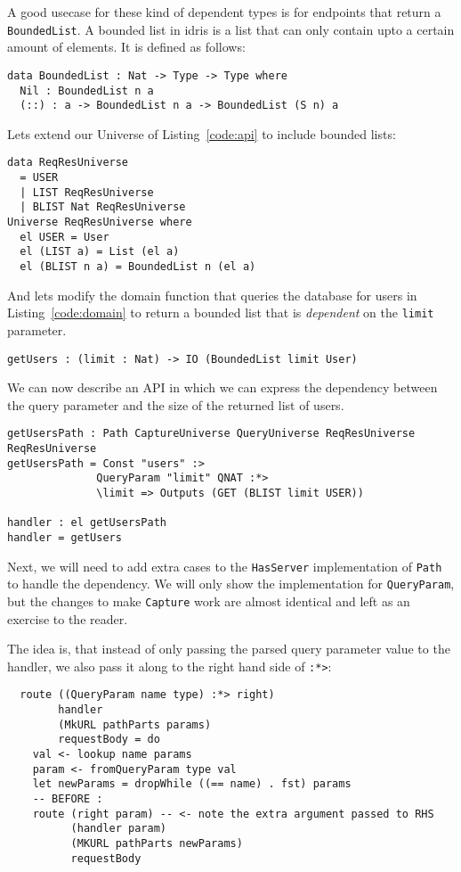 \documentclass[12pt,a4paper]{article}
\begin{document}
A good usecase for these kind of dependent types is for endpoints that return a \texttt{BoundedList}.
A bounded list in idris is a list that can only contain upto a certain amount of elements. It is defined as follows:
\begin{verbatim}
data BoundedList : Nat -> Type -> Type where
  Nil : BoundedList n a
  (::) : a -> BoundedList n a -> BoundedList (S n) a
\end{verbatim}

Lets extend our Universe of Listing~\ref{code:api} to include bounded lists:
\begin{verbatim}
data ReqResUniverse
  = USER
  | LIST ReqResUniverse
  | BLIST Nat ReqResUniverse
Universe ReqResUniverse where
  el USER = User
  el (LIST a) = List (el a)
  el (BLIST n a) = BoundedList n (el a)
\end{verbatim}
And lets modify the domain function that queries the database for users
in Listing~\ref{code:domain} to return a bounded list that is \emph{dependent} on the \texttt{limit} parameter.

\begin{verbatim}
getUsers : (limit : Nat) -> IO (BoundedList limit User)
\end{verbatim}
We can now describe an API in which we can express the dependency between the query parameter
and the size of the returned list of users.
\begin{verbatim}
getUsersPath : Path CaptureUniverse QueryUniverse ReqResUniverse ReqResUniverse
getUsersPath = Const "users" :> 
              QueryParam "limit" QNAT :*>
              \limit => Outputs (GET (BLIST limit USER))

handler : el getUsersPath
handler = getUsers
\end{verbatim}

Next, we will need to add extra cases to the \texttt{HasServer}
implementation of \texttt{Path} to handle the dependency. We
will only show the implementation for \texttt{QueryParam},
but the changes to make \texttt{Capture} work are almost identical and left as an exercise to the reader.

The idea is, that instead of only passing the parsed query parameter value
to the handler, we also pass it along to the right hand side of \texttt{:*>}:
\begin{verbatim}
  route ((QueryParam name type) :*> right)
        handler
        (MkURL pathParts params)
        requestBody = do
    val <- lookup name params
    param <- fromQueryParam type val
    let newParams = dropWhile ((== name) . fst) params
    -- BEFORE :
    route (right param) -- <- note the extra argument passed to RHS
          (handler param)
          (MKURL pathParts newParams)
          requestBody

\end{verbatim}
\end{document}
